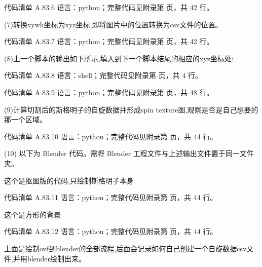 \documentclass[lang=cn,scheme=chinese,color=blue,device=normal,toc=onecol,math=cm]{elegantbook}
\begin{document}
\begin{codeindexbox}{代码清单 A.83.6}
语言：python；完整代码见附录第 \pageref{code:83:6} 页，共 42 行。
\end{codeindexbox}


(7)转换xywh坐标为xyz坐标,即将图片中的位置转换为csv文件的位置。\par


\begin{codeindexbox}{代码清单 A.83.7}
语言：python；完整代码见附录第 \pageref{code:83:7} 页，共 42 行。
\end{codeindexbox}


(8)上一个脚本的输出如下所示,填入到下一个脚本结尾的相应的xyz坐标处:\par


\begin{codeindexbox}{代码清单 A.83.8}
语言：shell；完整代码见附录第 \pageref{code:83:8} 页，共 4 行。
\end{codeindexbox}


\begin{codeindexbox}{代码清单 A.83.9}
语言：python；完整代码见附录第 \pageref{code:83:9} 页，共 48 行。
\end{codeindexbox}


(9)计算切割后的斯格明子的自旋数据并形成spin texture图,观察是否是自己想要的那一个区域。\par


\begin{codeindexbox}{代码清单 A.83.10}
语言：python；完整代码见附录第 \pageref{code:83:10} 页，共 44 行。
\end{codeindexbox}


(10) 以下为 Blender 代码。需将 Blender 工程文件与上述输出文件置于同一文件夹。\par


这个是抠图版的代码,只绘制斯格明子本身\par


\begin{codeindexbox}{代码清单 A.83.11}
语言：python；完整代码见附录第 \pageref{code:83:11} 页，共 44 行。
\end{codeindexbox}


这个是方形的背景\par


\begin{codeindexbox}{代码清单 A.83.12}
语言：python；完整代码见附录第 \pageref{code:83:12} 页，共 44 行。
\end{codeindexbox}


上面是绘制ovf到blender的全部流程,后面会记录如何自己创建一个自旋数据csv文件,并用blender绘制出来。\par
\end{document}
